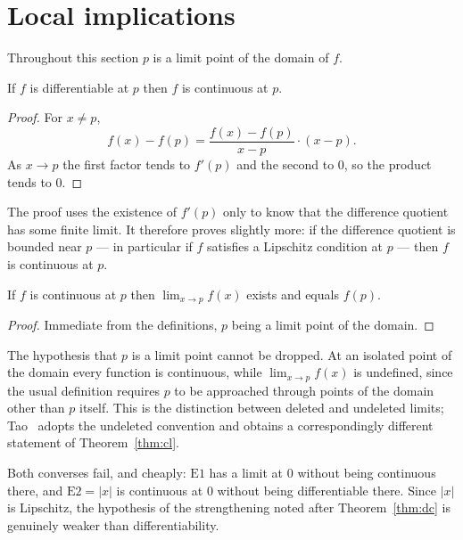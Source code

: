 \section{Local implications}
\label{sec:local}

Throughout this section $p$ is a limit point of the domain of $f$.

\begin{theorem}\label{thm:dc}
If $f$ is differentiable at $p$ then $f$ is continuous at $p$.
\end{theorem}

\begin{proof}
For $x \ne p$,
\[ f(x)-f(p) = \frac{f(x)-f(p)}{x-p}\cdot(x-p). \]
As $x \to p$ the first factor tends to $f'(p)$ and the second to $0$, so the
product tends to $0$.
\end{proof}

The proof uses the existence of $f'(p)$ only to know that the difference
quotient has some finite limit. It therefore proves slightly more: if the
difference quotient is bounded near $p$ --- in particular if $f$ satisfies a
Lipschitz condition at $p$ --- then $f$ is continuous at $p$.

\begin{theorem}\label{thm:cl}
If $f$ is continuous at $p$ then $\lim_{x\to p} f(x)$ exists and equals
$f(p)$.
\end{theorem}

\begin{proof}
Immediate from the definitions, $p$ being a limit point of the domain.
\end{proof}

\begin{remark}
The hypothesis that $p$ is a limit point cannot be dropped. At an isolated
point of the domain every function is continuous, while $\lim_{x\to p}f(x)$
is undefined, since the usual definition requires $p$ to be approached
through points of the domain other than $p$ itself. This is the
distinction between deleted and undeleted limits; Tao~\cite[\S9.3]{taoI}
adopts the undeleted convention and obtains a correspondingly different
statement of Theorem~\ref{thm:cl}.
\end{remark}

Both converses fail, and cheaply: $\mathrm{E}1$ has a limit at $0$ without
being continuous there, and $\mathrm{E}2 = |x|$ is continuous at $0$ without
being differentiable there. Since $|x|$ is Lipschitz, the hypothesis of the
strengthening noted after Theorem~\ref{thm:dc} is genuinely weaker than
differentiability.

